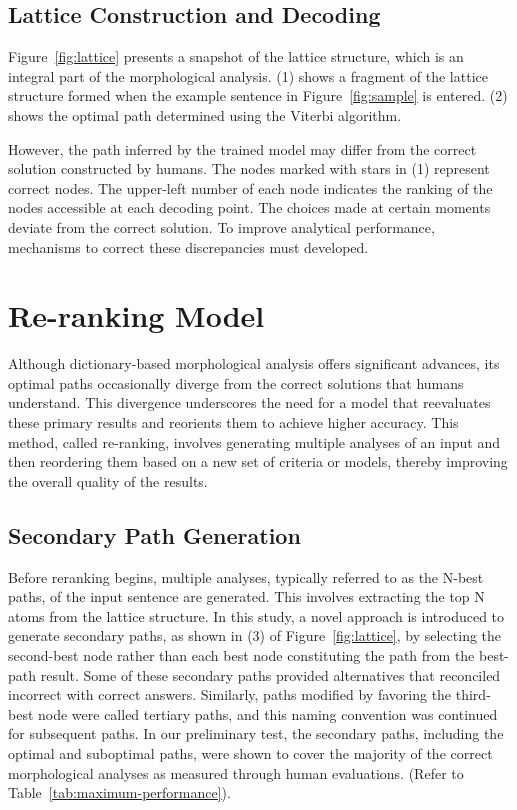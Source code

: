 \documentclass[AMS,STIX2COL]{WileyNJD-v2}
\begin{document}
    \subsection{Lattice Construction and Decoding}\label{subsec:lattice-construction-and-decoding}

    Figure~\ref{fig:lattice} presents a snapshot of the lattice structure, which is an integral part of the morphological analysis.
    (1) shows a fragment of the lattice structure formed when the example sentence in Figure~\ref{fig:sample} is entered.
    (2) shows the optimal path determined using the Viterbi algorithm.

    However, the path inferred by the trained model may differ from the correct solution constructed by humans.
    The nodes marked with stars in (1) represent correct nodes.
    The upper-left number of each node indicates the ranking of the nodes accessible at each decoding point.
    The choices made at certain moments deviate from the correct solution.
    To improve analytical performance, mechanisms to correct these discrepancies must developed.


    \section{Re-ranking Model}\label{sec:reranking-model}

    Although dictionary-based morphological analysis offers significant advances, its optimal paths occasionally diverge from the correct solutions that humans understand.
    This divergence underscores the need for a model that reevaluates these primary results and reorients them to achieve higher accuracy.
    This method, called re-ranking, involves generating multiple analyses of an input and then reordering them based on a new set of criteria or models, thereby improving the overall quality of the results.

    \subsection{Secondary Path Generation}\label{subsec:secondary-path-generation}

    Before reranking begins, multiple analyses, typically referred to as the N-best paths, of the input sentence are generated.
    This involves extracting the top N atoms from the lattice structure.
    In this study, a novel approach is introduced to generate secondary paths, as shown in (3) of Figure~\ref{fig:lattice}, by selecting the second-best node rather than each best node constituting the path from the best-path result.
    Some of these secondary paths provided alternatives that reconciled incorrect with correct answers.
    Similarly, paths modified by favoring the third-best node were called tertiary paths, and this naming convention was continued for subsequent paths.
    In our preliminary test, the secondary paths, including the optimal and suboptimal paths, were shown to cover the majority of the correct morphological analyses as measured through human evaluations.
    (Refer to Table~\ref{tab:maximum-performance}).
\end{document}
